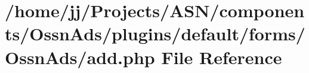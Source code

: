 \hypertarget{components_2_ossn_ads_2plugins_2default_2forms_2_ossn_ads_2add_8php}{}\section{/home/jj/\+Projects/\+A\+S\+N/components/\+Ossn\+Ads/plugins/default/forms/\+Ossn\+Ads/add.php File Reference}
\label{components_2_ossn_ads_2plugins_2default_2forms_2_ossn_ads_2add_8php}
